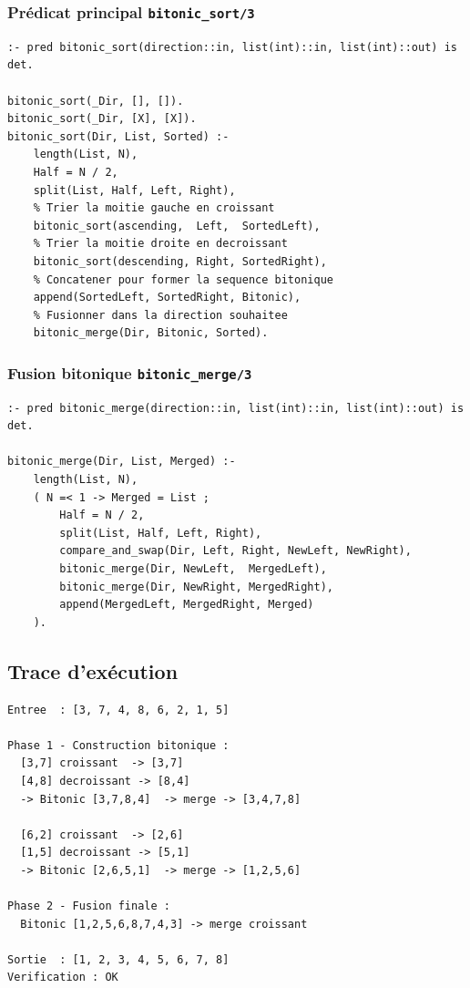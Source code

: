 \documentclass[12pt,a4paper]{article}
\newcommand{\code}[1]{\texttt{\color{keywordcolor}#1}}
\begin{document}
\subsubsection{Prédicat principal \code{bitonic\_sort/3}}

\begin{lstlisting}[caption={Tri bitonique récursif en Mercury}]
:- pred bitonic_sort(direction::in, list(int)::in, list(int)::out) is det.

bitonic_sort(_Dir, [], []).
bitonic_sort(_Dir, [X], [X]).
bitonic_sort(Dir, List, Sorted) :-
    length(List, N),
    Half = N / 2,
    split(List, Half, Left, Right),
    % Trier la moitie gauche en croissant
    bitonic_sort(ascending,  Left,  SortedLeft),
    % Trier la moitie droite en decroissant
    bitonic_sort(descending, Right, SortedRight),
    % Concatener pour former la sequence bitonique
    append(SortedLeft, SortedRight, Bitonic),
    % Fusionner dans la direction souhaitee
    bitonic_merge(Dir, Bitonic, Sorted).
\end{lstlisting}

\subsubsection{Fusion bitonique \code{bitonic\_merge/3}}

\begin{lstlisting}[caption={Fusion bitonique par compare-and-swap}]
:- pred bitonic_merge(direction::in, list(int)::in, list(int)::out) is det.

bitonic_merge(Dir, List, Merged) :-
    length(List, N),
    ( N =< 1 -> Merged = List ;
        Half = N / 2,
        split(List, Half, Left, Right),
        compare_and_swap(Dir, Left, Right, NewLeft, NewRight),
        bitonic_merge(Dir, NewLeft,  MergedLeft),
        bitonic_merge(Dir, NewRight, MergedRight),
        append(MergedLeft, MergedRight, Merged)
    ).
\end{lstlisting}

\subsection{Trace d'exécution}

\begin{resultbox}
\begin{verbatim}
Entree  : [3, 7, 4, 8, 6, 2, 1, 5]

Phase 1 - Construction bitonique :
  [3,7] croissant  -> [3,7]
  [4,8] decroissant -> [8,4]
  -> Bitonic [3,7,8,4]  -> merge -> [3,4,7,8]

  [6,2] croissant  -> [2,6]
  [1,5] decroissant -> [5,1]
  -> Bitonic [2,6,5,1]  -> merge -> [1,2,5,6]

Phase 2 - Fusion finale :
  Bitonic [1,2,5,6,8,7,4,3] -> merge croissant

Sortie  : [1, 2, 3, 4, 5, 6, 7, 8]
Verification : OK
\end{verbatim}
\end{resultbox}
\end{document}
